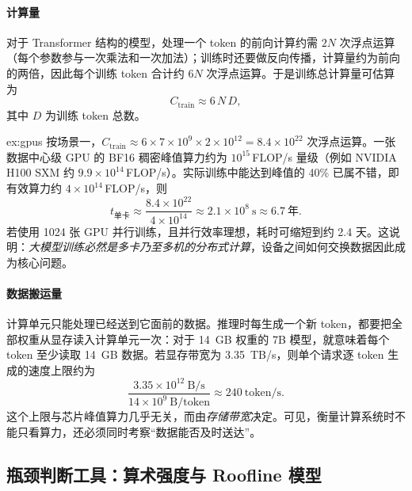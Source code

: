 \paragraph{计算量} 对于 Transformer 结构的模型，处理一个 token 的前向计算约需 $2N$ 次浮点运算（每个参数参与一次乘法和一次加法）；训练时还要做反向传播，计算量约为前向的两倍，因此每个训练 token 合计约 $6N$ 次浮点运算\cite{kaplan2020scaling}。于是训练总计算量可估算为
\begin{equation}
  C_{\mathrm{train}} \approx 6\,N\,D,
  \label{eq:train-flops}
\end{equation}
其中 $D$ 为训练 token 总数。

\begin{example}[训练需要多少张卡]{ex:gpus}
按场景一，$C_{\mathrm{train}}\approx 6\times7\times10^{9}\times2\times10^{12}=8.4\times10^{22}$ 次浮点运算。一张数据中心级 GPU 的 BF16 稠密峰值算力约为 $10^{15}$\,FLOP/s 量级（例如 NVIDIA H100 SXM 约 $9.9\times10^{14}$\,FLOP/s\cite{nvidia2023h100}）。实际训练中能达到峰值的 40\% 已属不错，即有效算力约 $4\times10^{14}$\,FLOP/s，则
\[
  t_{\text{单卡}} \approx \frac{8.4\times10^{22}}{4\times10^{14}} \approx 2.1\times10^{8}\ \text{s} \approx 6.7\ \text{年}.
\]
若使用 1024 张 GPU 并行训练，且并行效率理想，耗时可缩短到约 2.4 天。这说明：\emph{大模型训练必然是多卡乃至多机的分布式计算}，设备之间如何交换数据因此成为核心问题。
\end{example}

\paragraph{数据搬运量} 计算单元只能处理已经送到它面前的数据。推理时每生成一个新 token，都要把全部权重从显存读入计算单元一次：对于 \SI{14}{GB} 权重的 7B 模型，就意味着每个 token 至少读取 \SI{14}{GB} 数据。若显存带宽为 \SI{3.35}{TB/s}，则单个请求逐 token 生成的速度上限约为
\[
  \frac{3.35\times10^{12}\ \text{B/s}}{14\times10^{9}\ \text{B/token}} \approx 240\ \text{token/s}.
\]
这个上限与芯片峰值算力几乎无关，而由\emph{存储带宽}决定。可见，衡量计算系统时不能只看算力，还必须同时考察“数据能否及时送达”。

\subsection{瓶颈判断工具：算术强度与 Roofline 模型}
\label{subsec:roofline}

